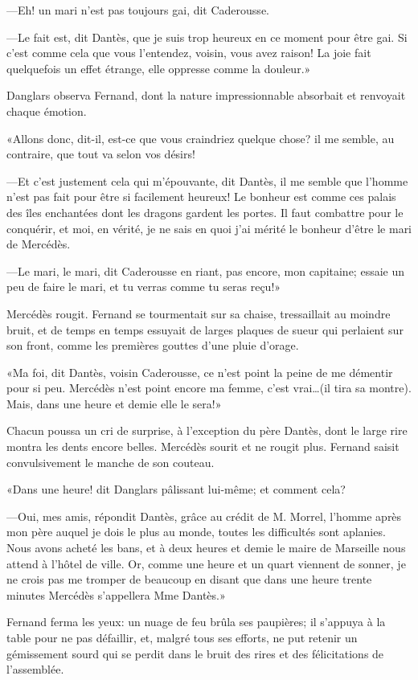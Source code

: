 —Eh! un mari n'est pas toujours gai, dit Caderousse.

—Le fait est, dit Dantès, que je suis trop heureux en ce moment pour être gai. Si c'est comme cela que vous l'entendez, voisin, vous avez raison! La joie fait quelquefois un effet étrange, elle oppresse comme la douleur.»

Danglars observa Fernand, dont la nature impressionnable absorbait et renvoyait chaque émotion.

«Allons donc, dit-il, est-ce que vous craindriez quelque chose? il me semble, au contraire, que tout va selon vos désirs!

—Et c'est justement cela qui m'épouvante, dit Dantès, il me semble que l'homme n'est pas fait pour être si facilement heureux! Le bonheur est comme ces palais des îles enchantées dont les dragons gardent les portes. Il faut combattre pour le conquérir, et moi, en vérité, je ne sais en quoi j'ai mérité le bonheur d'être le mari de Mercédès.

—Le mari, le mari, dit Caderousse en riant, pas encore, mon capitaine; essaie un peu de faire le mari, et tu verras comme tu seras reçu!»

Mercédès rougit. Fernand se tourmentait sur sa chaise, tressaillait au moindre bruit, et de temps en temps essuyait de larges plaques de sueur qui perlaient sur son front, comme les premières gouttes d'une pluie d'orage.

«Ma foi, dit Dantès, voisin Caderousse, ce n'est point la peine de me démentir pour si peu. Mercédès n'est point encore ma femme, c'est vrai\dots (il tira sa montre). Mais, dans une heure et demie elle le sera!»

Chacun poussa un cri de surprise, à l'exception du père Dantès, dont le large rire montra les dents encore belles. Mercédès sourit et ne rougit plus. Fernand saisit convulsivement le manche de son couteau.

«Dans une heure! dit Danglars pâlissant lui-même; et comment cela?

—Oui, mes amis, répondit Dantès, grâce au crédit de M. Morrel, l'homme après mon père auquel je dois le plus au monde, toutes les difficultés sont aplanies. Nous avons acheté les bans, et à deux heures et demie le maire de Marseille nous attend à l'hôtel de ville. Or, comme une heure et un quart viennent de sonner, je ne crois pas me tromper de beaucoup en disant que dans une heure trente minutes Mercédès s'appellera Mme Dantès.»

Fernand ferma les yeux: un nuage de feu brûla ses paupières; il s'appuya à la table pour ne pas défaillir, et, malgré tous ses efforts, ne put retenir un gémissement sourd qui se perdit dans le bruit des rires et des félicitations de l'assemblée.

